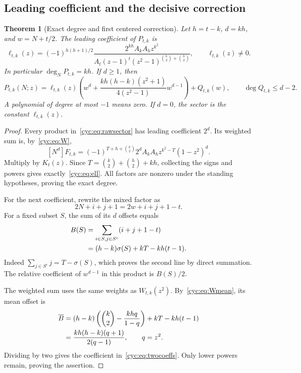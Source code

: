 \documentclass[11pt,a4paper]{article}
\numberwithin{equation}{section}
\newtheorem{theorem}{Theorem}[section]
\theoremstyle{definition}
\theoremstyle{remark}
\begin{document}
\subsection{Leading coefficient and the decisive correction}
\begin{theorem}[Exact degree and first centered correction]\label{cyc:thm:two}
Let $h=t-k$, $d=kh$, and $w=N+t/2$.  The leading coefficient of
$P_{t,k}$ is
\begin{equation}\label{cyc:eq:ell}
 \ell_{t,k}(z)=
 (-1)^{h(h+1)/2}
 \frac{2^{kh}A_kA_h z^{k^2}}
 {A_t(z-1)^t(z^2-1)^{\binom k2+\binom h2}},
 \qquad \ell_{t,k}(z)\ne0.
\end{equation}
In particular $\deg_N P_{t,k}=kh$.  If $d\ge1$, then
\begin{equation}\label{cyc:eq:twocoeffs}
 P_{t,k}(N;z)=\ell_{t,k}(z)
 \left(w^d+\frac{kh(h-k)(z^2+1)}{4(z^2-1)}w^{d-1}\right)
       +Q_{t,k}(w),
 \qquad \deg Q_{t,k}\le d-2.
\end{equation}
A polynomial of degree at most $-1$ means zero.  If $d=0$, the sector
is the constant $\ell_{t,k}(z)$.
\end{theorem}

\begin{proof}
Every product in~\eqref{cyc:eq:rawsector} has leading coefficient $2^d$.
Its weighted sum is, by~\eqref{cyc:eq:W},
\[
 [N^d]F_{t,k}
 =(-1)^{T+h+\binom k2}2^d A_kA_h
       z^{k^2-T}(1-z^2)^d.
\]
Multiply by $K_t(z)$.  Since
$T=\binom k2+\binom h2+kh$, collecting the signs and powers gives
exactly~\eqref{cyc:eq:ell}.  All factors are nonzero under the standing
hypotheses, proving the exact degree.

For the next coefficient, rewrite the mixed factor as
\[
 2N+i+j+1=2w+i+j+1-t.
\]
For a fixed subset $S$, the sum of its $d$ offsets equals
\begin{align}
 B(S)&=\sum_{i\in S,j\in S^c}(i+j+1-t)\notag\\
     &=(h-k)\sigma(S)+kT-kh(t-1).
 \label{cyc:eq:offsetsum}
\end{align}
Indeed $\sum_{j\in S^c}j=T-\sigma(S)$, which proves the second line
by direct summation.  The relative coefficient of $w^{d-1}$ in this
product is $B(S)/2$.

The weighted sum uses the same weights as $W_{t,k}(z^2)$.
By~\eqref{cyc:eq:Wmean}, its mean offset is
\begin{align}
 \overline B
 &=(h-k)\left(\binom k2-\frac{khq}{1-q}\right)
       +kT-kh(t-1)\notag\\
 &=\frac{kh(h-k)(q+1)}{2(q-1)},\qquad q=z^2.
 \label{cyc:eq:Bmean}
\end{align}
Dividing by two gives the coefficient in~\eqref{cyc:eq:twocoeffs}.
Only lower powers remain, proving the assertion.
\end{proof}
\end{document}

